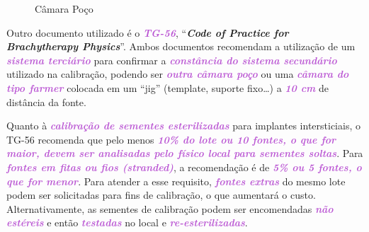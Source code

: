 \documentclass[11pt,a4paper]{article}
\begin{document}
	\begin{figure}
		\centering
		\caption{Câmara Poço}
		\label{fig:camaraPoco}
	\end{figure}

	Outro documento utilizado é o \textcolor{MediumOrchid}{\textbf{\textit{TG-56}}}, ``\textbf{\textit{Code of Practice for Brachytherapy Physics}}''. Ambos documentos recomendam a utilização de um \textcolor{MediumOrchid}{\textbf{\textit{sistema terciário}}} para confirmar a \textcolor{MediumOrchid}{\textbf{\textit{constância do sistema secundário}}} utilizado na calibração, podendo ser \textcolor{MediumOrchid}{\textbf{\textit{outra câmara poço}}} ou uma \textcolor{MediumOrchid}{\textbf{\textit{câmara do tipo farmer}}} colocada em um ``jig'' (template, suporte fixo\dots) a \textcolor{MediumOrchid}{\textbf{\textit{10 cm}}} de distância da fonte.

	Quanto à \textcolor{MediumOrchid}{\textbf{\textit{calibração de sementes esterilizadas}}} para implantes intersticiais, o TG-56 recomenda que pelo menos \textcolor{MediumOrchid}{\textbf{\textit{10\% do lote ou 10 fontes, o que for maior, devem ser analisadas pelo físico local para sementes soltas}}}. Para \textcolor{MediumOrchid}{\textbf{\textit{fontes em fitas ou fios (stranded)}}}, a recomendação é de \textcolor{MediumOrchid}{\textbf{\textit{5\% ou 5 fontes, o que for menor}}}. Para atender a esse requisito, \textcolor{MediumOrchid}{\textbf{\textit{fontes extras}}} do mesmo lote podem ser solicitadas para fins de calibração, o que aumentará o custo. Alternativamente, as sementes de calibração podem ser encomendadas \textcolor{MediumOrchid}{\textbf{\textit{não estéreis}}} e então \textcolor{MediumOrchid}{\textbf{\textit{testadas}}} no local e \textcolor{MediumOrchid}{\textbf{\textit{re-esterilizadas}}}.
\end{document}
